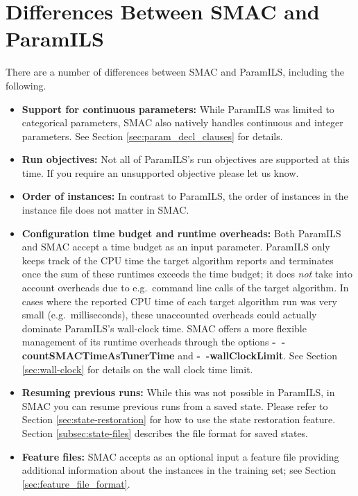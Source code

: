 \section{Differences Between SMAC and ParamILS}

There are a number of differences between SMAC and ParamILS, including the following.

\begin{itemize}
\item \textbf{Support for continuous parameters:} 
While ParamILS was limited to categorical parameters, SMAC also natively handles continuous and integer parameters. See Section \ref{sec:param_decl_clauses} for details.

\item \textbf{Run objectives:} 
Not all of ParamILS's run objectives are supported at this time. If you require an unsupported objective please let us know.

\item \textbf{Order of instances:} 
In contrast to ParamILS, the order of instances in the instance file does not matter in SMAC.

\item \textbf{Configuration time budget and runtime overheads:} 
Both ParamILS and SMAC accept a time budget as an input parameter. ParamILS only keeps track of the CPU time the target algorithm reports and terminates once the sum of these runtimes exceeds the time budget; it does \emph{not} take into account overheads due to e.g.\ command line calls of the target algorithm. In cases where the reported CPU time of each target algorithm run was very small (e.g.\ milliseconds), these unaccounted overheads could actually dominate ParamILS's wall-clock time.
SMAC offers a more flexible management of its runtime overheads through the options 
\textbf{-~$\!$-countSMACTimeAsTunerTime} and \textbf{-~$\!$-wallClockLimit}. See Section \ref{sec:wall-clock} for details on the wall clock time limit.

\item \textbf{Resuming previous runs:} 
While this was not possible in ParamILS, in SMAC you can resume previous runs from a saved state.
Please refer to Section \ref{sec:state-restoration} for how to use the state restoration feature. Section \ref{subsec:state-files} describes the file format for saved states.

\item \textbf{Feature files:} 
SMAC accepts as an optional input a feature file providing additional information about the instances in the training set; see Section \ref{sec:feature_file_format}.



\end{itemize}
